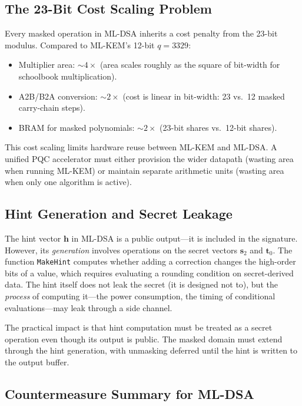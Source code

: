 \subsection{The 23-Bit Cost Scaling Problem}
\label{subsec:23bit-cost}

Every masked operation in ML-DSA inherits a cost penalty from the 23-bit modulus.  Compared to ML-KEM's 12-bit $q = 3329$:
\begin{itemize}
\item Multiplier area: $\sim$$4\times$ (area scales roughly as the square of bit-width for schoolbook multiplication).
\item A2B/B2A conversion: $\sim$$2\times$ (cost is linear in bit-width: 23 vs.\ 12 masked carry-chain steps).
\item BRAM for masked polynomials: $\sim$$2\times$ (23-bit shares vs.\ 12-bit shares).
\end{itemize}

This cost scaling limits hardware reuse between ML-KEM and ML-DSA.  A unified PQC accelerator must either provision the wider datapath (wasting area when running ML-KEM) or maintain separate arithmetic units (wasting area when only one algorithm is active).

\subsection{Hint Generation and Secret Leakage}
\label{subsec:hint-generation}

The hint vector $\mathbf{h}$ in ML-DSA is a public output---it is included in the signature.  However, its \emph{generation} involves operations on the secret vectors $\mathbf{s}_2$ and $\mathbf{t}_0$.  The function \texttt{MakeHint} computes whether adding a correction changes the high-order bits of a value, which requires evaluating a rounding condition on secret-derived data.  The hint itself does not leak the secret (it is designed not to), but the \emph{process} of computing it---the power consumption, the timing of conditional evaluations---may leak through a side channel.

The practical impact is that hint computation must be treated as a secret operation even though its output is public.  The masked domain must extend through the hint generation, with unmasking deferred until the hint is written to the output buffer.

\subsection{Countermeasure Summary for ML-DSA}
\label{subsec:mldsa-countermeasures}

